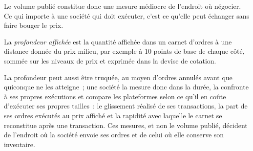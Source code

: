 \begin{omfigure}

\label{fig:m3:spot-markets:sizes}
\end{omfigure}

Le volume publié constitue donc une mesure médiocre de l'endroit où négocier. Ce qui importe à une société qui doit exécuter,
c'est ce qu'elle peut échanger sans faire bouger le prix.

\begin{definition}\label{def:m3:spot-markets:depth}
La \emph{profondeur affichée} est la quantité affichée dans un carnet d'ordres à une distance donnée du
prix milieu, par exemple à 10 points de base de chaque côté, sommée sur les niveaux de prix et exprimée dans la
devise de cotation.
\end{definition}

La profondeur peut aussi être truquée, au moyen d'ordres annulés avant que quiconque ne les atteigne~; une société la mesure donc dans la durée,
la confronte à ses propres exécutions et compare les plateformes selon ce qu'il en coûte d'exécuter ses propres tailles~: le glissement réalisé de ses transactions,
la part de ses ordres exécutés au prix affiché et la rapidité avec laquelle le carnet se reconstitue après
une transaction. Ces mesures, et non le volume publié, décident de l'endroit où la société envoie ses ordres et de celui où elle
conserve son inventaire.


